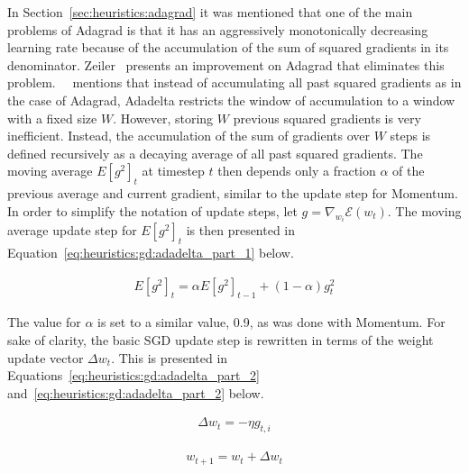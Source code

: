 In Section~\ref{sec:heuristics:adagrad} it was mentioned that one of the main problems of \ac{Adagrad} is that it has an aggressively monotonically decreasing learning rate because of the accumulation of the sum of squared gradients in its denominator. Zeiler~\cite{ref:zeiler:2012} presents an improvement on \ac{Adagrad} that eliminates this problem.~\citeauthor{ref:ruder:2016}~\cite{ref:ruder:2016} mentions that instead of accumulating all past squared gradients as in the case of \ac{Adagrad}, \ac{Adadelta} restricts the window of accumulation to a window with a fixed size $W$. However, storing $W$ previous squared gradients is very inefficient. Instead, the accumulation of the sum of gradients over $W$ steps is defined recursively as a decaying average of all past squared gradients. The moving average $E[g^{2}]_{t}$ at timestep $t$ then depends only a fraction $\alpha$ of the previous average and current gradient, similar to the update step for \ac{Momentum}. In order to simplify the notation of update steps, let $g = \nabla_{w_{i}}\mathcal{E}(w_{t})$. The moving average update step for $E[g^{2}]_{t}$ is then presented in Equation~\ref{eq:heuristics:gd:adadelta_part_1} below.

\begin{equation}
      \label{eq:heuristics:gd:adadelta_part_1}
      \begin{split}
            E[g^{2}]_{t} = \alpha E[g^{2}]_{t - 1} + (1 - \alpha)g_{t}^{2}
      \end{split}
\end{equation}

The value for $\alpha$ is set to a similar value, 0.9, as was done with \ac{Momentum}. For sake of clarity, the basic \ac{SGD} update step is rewritten in terms of the weight update vector $\Delta w_{t}$. This is presented in Equations~\ref{eq:heuristics:gd:adadelta_part_2} and~\ref{eq:heuristics:gd:adadelta_part_2} below.

\begin{equation}
      \label{eq:heuristics:gd:adadelta_part_2}
      \begin{split}
            \Delta w_{t} = -\eta g_{t,i}
      \end{split}
\end{equation}

\begin{equation}
      \label{eq:heuristics:gd:adadelta_part_3}
      \begin{split}
            w_{t+1} = w_{t} + \Delta w_{t}
      \end{split}
\end{equation}

